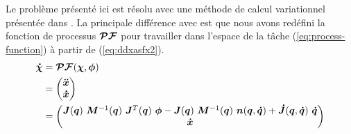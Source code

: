 \documentclass[pdftex,a4paper,11pt]{article}
\begin{document}
Le problème présenté ici est résolu avec une méthode de calcul variationnel
\cite{kirk04} présentée dans \cite{rigoux11}.
La principale différence avec \cite{rigoux11} est que nous avons redéfini 
la fonction de processus $\boldsymbol{\mathcal{PF}}$ pour travailler dans l'espace
de la tâche (\ref{eq:process-function}) à partir de (\ref{eq:ddxasfx2}).
\begin{align}
    \boldsymbol{\dot{\chi}} & = \boldsymbol{\mathcal{PF}}(\boldsymbol{\chi}, \boldsymbol{\phi}) \\
             & = \begin{pmatrix} \boldsymbol{\ddot{x}} \\ \boldsymbol{\dot{x}} \end{pmatrix} \nonumber \\
             & = \begin{pmatrix}
                     \boldsymbol{J}(\boldsymbol{q}) ~ \boldsymbol{M}^{-1}(\boldsymbol{q}) ~ \boldsymbol{J}^T(\boldsymbol{q}) ~ \boldsymbol{\phi} - \boldsymbol{J}(\boldsymbol{q}) ~ \boldsymbol{M}^{-1}(\boldsymbol{q}) ~ \boldsymbol{n}( \boldsymbol{q}, \boldsymbol{\dot{q}} ) + \boldsymbol{\dot{J}}(\boldsymbol{q}, \boldsymbol{\dot{q}}) ~ \boldsymbol{\dot{q}} \\
                     \boldsymbol{\dot{x}}
                 \end{pmatrix} \label{eq:process-function}
\end{align}
\end{document}
